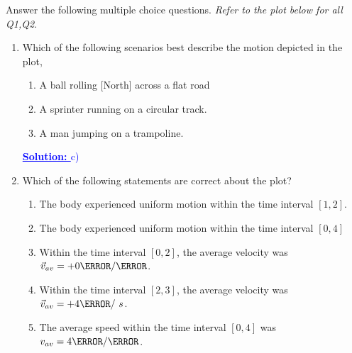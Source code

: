 \documentclass[12pt]{article} %
\newcommand{\tx}[1]{\text{#1}}
\begin{document}
\begin{qstn}[2]
Answer the following multiple choice questions. \emph{Refer to the plot below for all Q1,Q2}.
		\begin{center}
		\end{center}
	\begin{enumerate}
		\item Which of the following scenarios best describe the motion depicted in the plot,

			\begin{enumerate}[label = (\alph*)]
				\item A ball rolling [North] across a flat road
				\item A sprinter running on a circular track.
				\item A man jumping on a trampoline.
			\end{enumerate}
			\textcolor{blue}{\textbf{\underline{Solution: }} c)}


		\item Which of the following statements are correct about the plot?
			\begin{enumerate}[label = (\alph*)]
				\item The body experienced uniform motion within the time interval $[1,2]$.
				\item The body experienced uniform motion within the time interval $[0,4]$
				\item Within the time interval $[0,2]$, the average velocity was $\vec v_{av} = +0 \m / \s$.
				\item Within the time interval $[2,3]$, the average velocity was $\vec v_{av} = +4 \m / \ s$.
				\item The average speed within the time interval $[0,4]$ was $v_{av} = 4 \m / \s$.
			\end{enumerate}


\end{enumerate}
\end{qstn}
\end{document}
